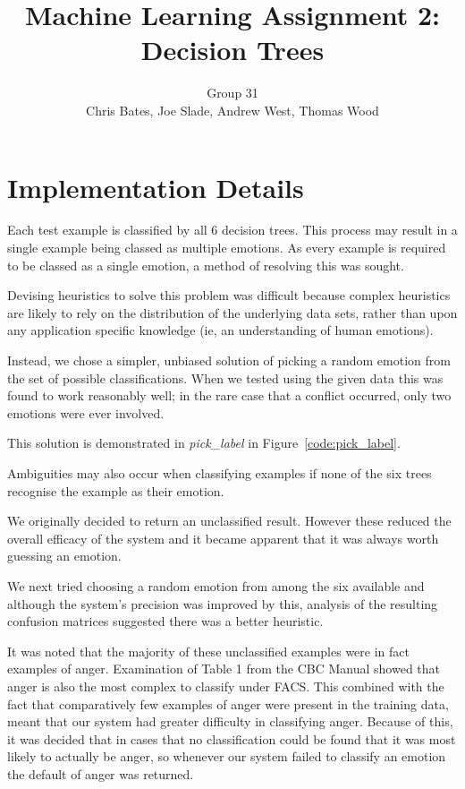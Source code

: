\documentclass[a4paper]{article}
\title{Machine Learning Assignment 2: Decision Trees}
\author{Group 31 \\ Chris Bates, Joe Slade, Andrew West, Thomas Wood}
\begin{document}
\maketitle
\section{Implementation Details}
Each test example is classified by all 6 decision trees. This process may
result in a single example being classed as multiple emotions. As every
example is required to be classed as a single emotion, a method of resolving
this was sought. 

Devising heuristics to solve this problem was difficult because complex
heuristics are likely to rely on the distribution of the underlying data
sets, rather than upon any application specific knowledge (ie, an
understanding of human emotions).

Instead, we chose a simpler, unbiased solution of picking a random emotion
from the set of possible classifications. When we tested using the given
data this was found to work reasonably well; in the rare case that a
conflict occurred, only two emotions were ever involved.

This solution is demonstrated in \emph{pick\_label} in
Figure~\ref{code:pick_label}.

Ambiguities may also occur when classifying examples if none of the six
trees recognise the example as their emotion.

We originally decided to return an unclassified result. However these 
reduced the overall efficacy of the system and it became apparent that it
was always worth guessing an emotion.

We next tried choosing a random emotion from among the six available and
although the system's precision was improved by this, analysis of the 
resulting confusion matrices suggested there was a better heuristic.

It was noted that the majority of these unclassified examples were in fact
examples of anger. Examination of Table 1 from the CBC Manual showed that
anger is also the most complex to classify under FACS. This combined with
the fact that comparatively few examples of anger were present in the
training data, meant that our system had greater difficulty in classifying
anger. Because of this, it was decided that in cases that no classification
could be found that it was most likely to actually be anger, so whenever our
system failed to classify an emotion the default of anger was returned.
\end{document}
